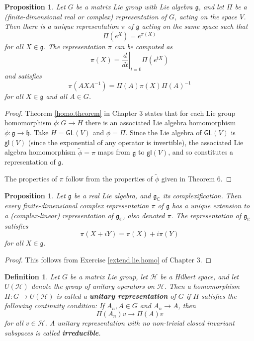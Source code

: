 \documentclass[12pt]{amsbook}
\let \frak = \mathfrak
\theoremstyle{plain}
\newtheorem{definition}[theorem]{Definition}
\newtheorem{proposition}[theorem]{Proposition}
\numberwithin{equation}{chapter}
\numberwithin{theorem}{chapter}
\begin{document}
\begin{proposition}
\label{relating.rep}Let $G$ be a matrix Lie group with Lie algebra $\frak{g}$,
and let $\Pi$ be a (finite-dimensional real or complex) representation of $G$,
acting on the space $V$. Then there is a unique representation $\pi$ of
$\frak{g}$ acting on the same space such that
\[
\Pi(e^{X})=e^{\pi(X)}%
\]
for all $X\in\frak{g}$. The representation $\pi$ can be computed as
\[
\pi(X)=\left.  \frac{d}{dt}\right|  _{t=0}\Pi\left(  e^{tX}\right)
\]
and satisfies
\[
\pi\left(  AXA^{-1}\right)  =\Pi(A)\pi(X)\Pi(A)^{-1}%
\]
for all $X\in\frak{g}$ and all $A\in G$.
\end{proposition}

\begin{proof}
Theorem \ref{homo.theorem} in Chapter 3 states that for each Lie group
homomorphism $\phi:G\rightarrow H$ there is an associated Lie algebra
homomorphism $\widetilde{\phi}:\frak{g}\rightarrow\frak{h}$. Take
$H=\mathsf{GL}(V)$ and $\phi=\Pi$. Since the Lie algebra of $\mathsf{GL}(V)$
is $\mathsf{gl}(V)$ (since the exponential of any operator is invertible), the
associated Lie algebra homomorphism $\widetilde{\phi}=\pi$ maps from
$\frak{g}$ to $\mathsf{gl}(V)$, and so constitutes a representation of
$\frak{g}$.

The properties of $\pi$ follow from the properties of $\widetilde{\phi}$ given
in Theorem 6.
\end{proof}

\begin{proposition}
\label{rep.complex}Let $\frak{g}$ be a real Lie algebra, and $\frak{g}%
_{\mathbb{C}}$ its complexification. Then every finite-dimensional complex
representation $\pi$ of $\frak{g}$ has a unique extension to a
(complex-linear) representation of $\frak{g}_{\mathbb{C}}$, also denoted $\pi
$. The representation of $\frak{g}_{\mathbb{C}}$ satisfies
\[
\pi(X+iY)=\pi(X)+i\pi(Y)
\]
for all $X\in\frak{g}$.
\end{proposition}

\begin{proof}
This follows from Exercise \ref{extend.lie.homo} of Chapter 3.
\end{proof}

\begin{definition}
Let $G$ be a matrix Lie group, let $\mathcal{H}$ be a Hilbert space, and let
$U(\mathcal{H})$ denote the group of unitary operators on $\mathcal{H}$. Then
a homomorphism $\Pi:G\rightarrow U(\mathcal{H})$ is called a \textbf{unitary
representation} of $G$ if $\Pi$ satisfies the following continuity condition:
If $A_{n},A\in G$ and $A_{n}\rightarrow A$, then
\[
\Pi(A_{n})v\rightarrow\Pi(A)v
\]
for all $v\in\mathcal{H}$. A unitary representation with no non-trivial
\textit{closed} invariant subspaces is called \textbf{irreducible}.
\end{definition}
\end{document}
